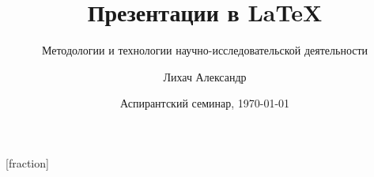 
\usepackage[T2A]{fontenc}
\usepackage[utf8]{inputenc}
\usepackage[russian,english]{babel}

\usepackage{graphicx}
\usepackage{booktabs}
\usepackage{xcolor}
\usepackage{mwe}       %
\usepackage{qrcode}    %

[fraction]

\usepackage{minted}



\newcommand{\cmd}[1]{\texttt{\textbackslash #1}}


\title{Презентации в \LaTeX{}}
\subtitle{Методологии и технологии научно-исследовательской деятельности}
\author{Лихач Александр}
\date{Аспирантский семинар, \today}